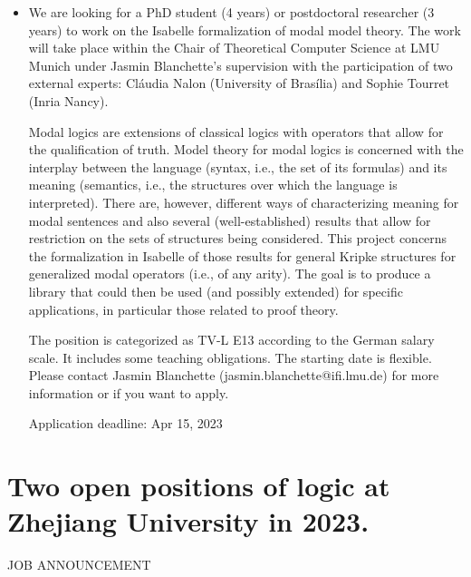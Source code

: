 \documentclass[prodmode,acmtecs]{acmsmall} %
\begin{document}
\begin{itemize}\item  We are looking for a PhD student (4 years) or postdoctoral researcher (3 years) to work on the Isabelle formalization of modal model theory. The work will take place within the Chair of Theoretical Computer Science at LMU Munich under Jasmin Blanchette's supervision with the participation of two external experts: Cláudia Nalon (University of Brasília) and Sophie Tourret (Inria Nancy). 
 
  Modal logics are extensions of classical logics with operators that allow for the qualification of truth. Model theory for modal logics is concerned with the interplay between the language (syntax, i.e., the set of its formulas) and its meaning (semantics, i.e., the structures over which the language is interpreted). There are, however, different ways of characterizing meaning for modal sentences and also several (well-established) results that allow for restriction on the sets of structures being considered. This project concerns the formalization in Isabelle of those results for general Kripke structures for generalized modal operators (i.e., of any arity). The goal is to produce a library that could then be used (and possibly extended) for specific applications, in particular those related to proof theory. 
 
  The position is categorized as TV-L E13 according to the German salary scale. It includes some teaching obligations. The starting date is flexible. Please contact Jasmin Blanchette (jasmin.blanchette@ifi.lmu.de) for more information or if you want to apply.  
 
Application deadline: Apr 15, 2023 
 
\end{itemize}\section{Two open positions of logic at Zhejiang University in 2023. }\label{TwoopenpositionsoflogicatZhejiangUniversityin2023}JOB ANNOUNCEMENT 
\end{document}
